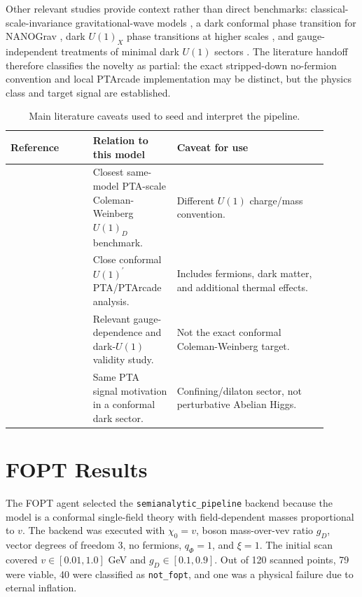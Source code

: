 \documentclass[11pt]{article}
\newcommand{\gD}{g_D}
\newcommand{\status}[1]{\texttt{#1}}
\begin{document}
Other relevant studies provide context rather than direct benchmarks: classical-scale-invariance gravitational-wave models \cite{Khoze:2023}, a dark conformal phase transition for NANOGrav \cite{Fujikura:2023}, dark \(U(1)_X\) phase transitions at higher scales \cite{Hashino:2018}, and gauge-independent treatments of minimal dark \(U(1)\) sectors \cite{Feng:2026}. The literature handoff therefore classifies the novelty as partial: the exact stripped-down no-fermion convention and local PTArcade implementation may be distinct, but the physics class and target signal are established.

\begin{table}[htbp]
\centering
\small
\begin{tabular}{p{0.24\linewidth}p{0.22\linewidth}p{0.44\linewidth}}
\toprule
Reference & Relation to this model & Caveat for use \\
\midrule
\cite{Borah:2021} & Closest same-model PTA-scale Coleman-Weinberg \(U(1)_D\) benchmark. & Different \(U(1)\) charge/mass convention. \\
\cite{Balan:2025} & Close conformal \(U(1)^\prime\) PTA/PTArcade analysis. & Includes fermions, dark matter, and additional thermal effects. \\
\cite{Feng:2026} & Relevant gauge-dependence and dark-\(U(1)\) validity study. & Not the exact conformal Coleman-Weinberg target. \\
\cite{Fujikura:2023} & Same PTA signal motivation in a conformal dark sector. & Confining/dilaton sector, not perturbative Abelian Higgs. \\
\bottomrule
\end{tabular}
\caption{Main literature caveats used to seed and interpret the pipeline.}
\label{tab:literature}
\end{table}

\section{FOPT Results}

The FOPT agent selected the \texttt{semianalytic\_pipeline} backend because the model is a conformal single-field theory with field-dependent masses proportional to \(v\). The backend was executed with \(\chi_0=v\), boson mass-over-vev ratio \(\gD\), vector degrees of freedom \(3\), no fermions, \(q_\Phi=1\), and \(\xi=1\). The initial scan covered \(v\in[0.01,1.0]\) GeV and \(\gD\in[0.1,0.9]\). Out of 120 scanned points, 79 were viable, 40 were classified as \status{not\_fopt}, and one was a physical failure due to eternal inflation.
\end{document}
